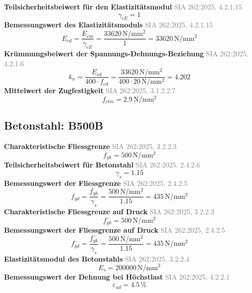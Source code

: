 \documentclass[11pt,a4paper]{article}
\newcommand{\normref}[1]{{\small\textcolor{gray}{#1}}}
\begin{document}
\noindent\textbf{Teilsicherheitsbeiwert für den Elastizitätsmodul} \hfill \normref{SIA 262:2025, 4.2.1.15}
\begin{equation*}
\gamma_{cE} = 1
\end{equation*}
\noindent\textbf{Bemessungswert des Elastizitätsmoduls} \hfill \normref{SIA 262:2025, 4.2.1.15}
\begin{equation*}
E_{cd} = \frac{E_{cm}}{\gamma_{cE}} = \frac{33620\,\mathrm{N}/\mathrm{mm}^{2}}{1} = 33620\,\mathrm{N}/\mathrm{mm}^{2}
\end{equation*}
\noindent\textbf{Krümmungsbeiwert der Spannungs-Dehnungs-Beziehung} \hfill \normref{SIA 262:2025, 4.2.1.6}
\begin{equation*}
k_{\sigma} = \frac{E_{cd}}{400 \cdot f_{cd}} = \frac{33620\,\mathrm{N}/\mathrm{mm}^{2}}{400 \cdot 20\,\mathrm{N}/\mathrm{mm}^{2}} = 4.202
\end{equation*}
\noindent\textbf{Mittelwert der Zugfestigkeit} \hfill \normref{SIA 262:2025, 3.1.2.2.7}
\begin{equation*}
f_{ctm} = 2.9\,\mathrm{N}/\mathrm{mm}^{2}
\end{equation*}
\subsection{Betonstahl: B500B}
\noindent\textbf{Charakteristische Fliessgrenze} \hfill \normref{SIA 262:2025, 3.2.2.3}
\begin{equation*}
f_{yk} = 500\,\mathrm{N}/\mathrm{mm}^{2}
\end{equation*}
\noindent\textbf{Teilsicherheitsbeiwert für Betonstahl} \hfill \normref{SIA 262:2025, 2.4.2.6}
\begin{equation*}
\gamma_s = 1.15
\end{equation*}
\noindent\textbf{Bemessungswert der Fliessgrenze} \hfill \normref{SIA 262:2025, 2.4.2.5}
\begin{equation*}
f_{yd} = \frac{f_{yk}}{\gamma_s} = \frac{500\,\mathrm{N}/\mathrm{mm}^{2}}{1.15} = 435\,\mathrm{N}/\mathrm{mm}^{2}
\end{equation*}
\noindent\textbf{Charakteristische Fliessgrenze auf Druck} \hfill \normref{SIA 262:2025, 3.2.2.3}
\begin{equation*}
f_{yk}^{-} = 500\,\mathrm{N}/\mathrm{mm}^{2}
\end{equation*}
\noindent\textbf{Bemessungswert der Fliessgrenze auf Druck} \hfill \normref{SIA 262:2025, 2.4.2.5}
\begin{equation*}
f_{yd}^{-} = \frac{f_{yk}^{-}}{\gamma_s} = \frac{500\,\mathrm{N}/\mathrm{mm}^{2}}{1.15} = 435\,\mathrm{N}/\mathrm{mm}^{2}
\end{equation*}
\noindent\textbf{Elastizitätsmodul des Betonstahls} \hfill \normref{SIA 262:2025, 3.2.2.4}
\begin{equation*}
E_s = 200000\,\mathrm{N}/\mathrm{mm}^{2}
\end{equation*}
\noindent\textbf{Bemessungswert der Dehnung bei Höchstlast} \hfill \normref{SIA 262:2025, 4.2.2.1}
\begin{equation*}
\varepsilon_{ud} = 4.5\,\%
\end{equation*}
\end{document}
